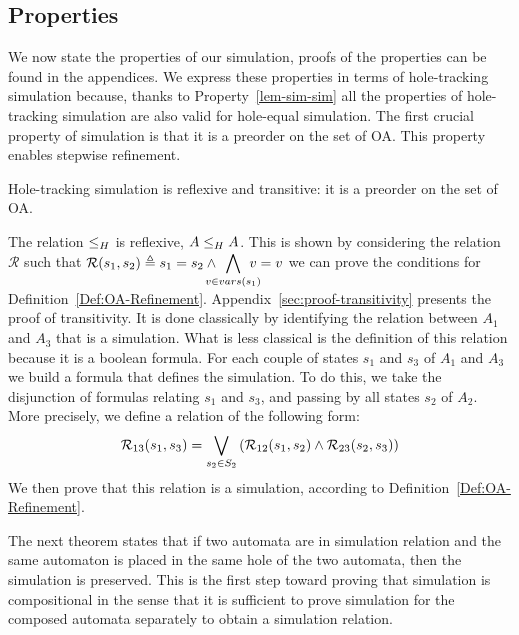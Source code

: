\documentclass[runningheads]{llncs}
\begin{document}
\subsection{Properties}

We now  state the properties of our simulation, proofs of the properties can be found in the appendices. We express these properties in terms of hole-tracking simulation because, thanks to Property~\ref{lem-sim-sim}   all the properties  of hole-tracking simulation are also valid  for hole-equal simulation.
The first crucial property of  simulation  is that it is  a  preorder on the set of OA. This property enables stepwise refinement.


\begin{theorem}
Hole-tracking simulation
   is reflexive  and  transitive:  it  is  a  preorder on the set of OA.
\end{theorem}

\begin{proofsketch}
The relation  \(\wrel{}{}{H}\) is reflexive,  \(\wrel{A}{A}{H}\). This is shown  by considering the relation $\mathcal{R}$ such that $\mathcal{R}\mpar{s_1, s_2} \triangleq s_1=s_2\land \displaystyle\bigwedge_\subbox{v \in vars(s_1)} {v=v}$   we can prove the conditions for Definition~\ref{Def:OA-Refinement}.
%
Appendix~\ref{sec:proof-transitivity} presents the proof of transitivity. It is done classically by identifying the relation between $A_1$ and $A_3$ that is a simulation. What is less classical is the definition of this relation because it is a boolean formula. For each couple of states  $s_1$ and $s_3$ of $A_1$ and $A_3$ we build a  formula that defines the simulation. To do this, we take the disjunction of formulas relating $s_1$ and $s_3$, and passing by all states $s_2$ of $A_2$. More precisely, we define a relation of the following form:
  \[\mathcal{R}_{13}(s_1,s_3)=\bigvee_{s_2\in S_2}\mpar{\mathcal{R}_{12}(s_1,s_2) \land \mathcal{R}_{23}(s_2,s_3) } \]
We then prove that this relation  is a simulation, according to Definition~\ref{Def:OA-Refinement}.
\end{proofsketch}

The next  theorem states that if two automata are in simulation relation and the same automaton is placed in the same hole of the two automata, then the simulation is preserved. This is the first step toward proving that
 simulation is compositional in the sense that it is sufficient to prove simulation for the composed automata separately to obtain a simulation relation.
%
%
\end{document}
